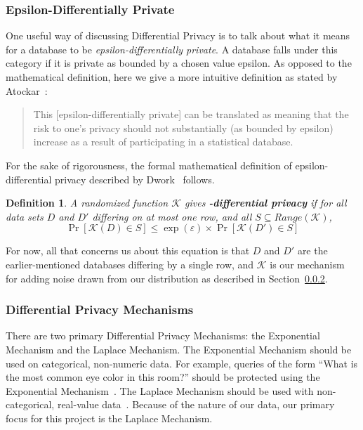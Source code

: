 \documentclass[conference,11pt]{IEEEtran}
\newtheorem{definition}{Definition}
\begin{document}
\subsubsection{Epsilon-Differentially Private}\label{sec:epsilon-dp}
One useful way of discussing Differential Privacy is to talk about what it means
for a database to be \textit{epsilon-differentially private}. A database falls
under this category if it is private as bounded by a chosen value epsilon. As
opposed to the mathematical definition, here we give a more intuitive definition
as stated by Atockar~\cite{Atockar:2014}:

\blockquote{%
    This [epsilon-differentially private] can be translated as meaning that the
    risk to one's privacy should not substantially (as bounded by epsilon)
    increase as a result of participating in a statistical database.
}

For the sake of rigorousness, the formal mathematical definition of
epsilon-differential privacy described by Dwork~\cite{Dwork:2006:DP} follows.

\begin{mdframed}
    \begin{definition}
        A randomized function $\mathcal{K}$ gives
        \textbf{\textepsilon-differential privacy} if for all data sets $D$ and
        $D'$ differing on at most one row, and all $S \subseteq
        Range(\mathcal{K})$,
        \begin{equation}
            \Pr[\mathcal{K}(D) \in S] \leq \exp(\varepsilon) \times
            \Pr[\mathcal{K}(D') \in S]
        \end{equation}
    \end{definition}
\end{mdframed}

For now, all that concerns us about this equation is that $D$ and $D'$ are the
earlier-mentioned databases differing by a single row, and $\mathcal{K}$ is our
mechanism for adding noise drawn from our distribution as described in
Section~\ref{sec:dp-mech}.

\subsubsection{Differential Privacy Mechanisms}\label{sec:dp-mech}
There are two primary Differential Privacy Mechanisms: the Exponential Mechanism
and the Laplace Mechanism. The Exponential Mechanism should be used on
categorical, non-numeric data. For example, queries of the form ``What is the
most common eye color in this room?'' should be protected using the Exponential
Mechanism~\cites{Atockar:2014}[8]{Roth:2011:DP-exp}. The Laplace Mechanism
should be used with non-categorical, real-value data~\cite{Geng:2014}. Because
of the nature of our data, our primary focus for this project is the Laplace
Mechanism.
\end{document}
